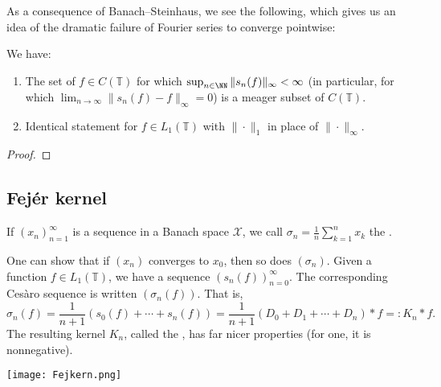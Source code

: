 
As a consequence of Banach--Steinhaus, we see the following, which gives us an idea of the dramatic failure of Fourier series to converge pointwise:

\begin{theorem}
We have:
\begin{enumerate}
\item The set of $f \in C(\mathbb{T})$ for which $\sup_{n \in \NN} \| s_n(f) \|_\infty < \infty$ (in particular, for which $\lim_{n \to \infty} \| s_n(f) - f \|_\infty = 0$) is a meager subset of $C(\mathbb{T})$.
\item Identical statement for $f \in L_1(\mathbb{T})$ with $\| \cdot \|_1$ in place of $\| \cdot \|_\infty$.
\end{enumerate}
\end{theorem}

\begin{proof}
\end{proof}

\subsection{Fej\'er kernel}

\begin{definition}
If $(x_n)_{n=1}^\infty$ is a sequence in a Banach space $\mathcal{X}$, we call $\sigma_n = \tfrac{1}{n} \sum_{k=1}^n x_k$ the .
\end{definition}

One can show that if $(x_n)$ converges to $x_0$, then so does $(\sigma_n)$. Given a function $f \in L_1(\mathbb{T})$, we have a sequence $(s_n(f))_{n=0}^\infty$. The corresponding Ces\`aro sequence is written $(\sigma_n(f))$. That is,
\[ \sigma_n(f) = \frac{1}{n+1}( s_0(f) + \cdots + s_n(f) ) = \frac{1}{n+1}(D_0 + D_1 + \cdots + D_n) * f =: K_n * f. \]
The resulting kernel $K_n$, called the , has far nicer properties (for one, it is nonnegative).

\begin{center}
\texttt{[image: Fejkern.png]}
\end{center}



